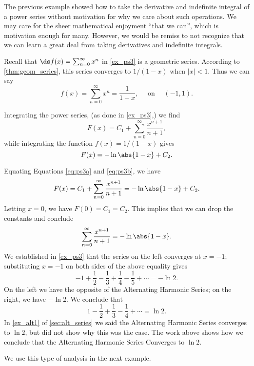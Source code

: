 The previous example showed how to take the derivative and indefinite integral of a power series without motivation for why we care about such operations. We may care for the sheer mathematical enjoyment ``that we can'', which is motivation enough for many. However, we would be remiss to not recognize that we can learn a great deal from taking derivatives and indefinite integrals.\bigskip

Recall that $\ds f(x) = \sum_{n=0}^\infty x^n$ in \autoref{ex_ps3} is a geometric series. According to \autoref{thm:geom_series}, this series converges to $1/(1-x)$ when $|x|<1$. Thus we can say
$$	f(x) = \sum_{n=0}^\infty x^n = \frac 1{1-x},\quad \text{ on }\quad (-1,1).$$

Integrating the power series, (as done in \autoref{ex_ps3},) we find
\begin{equation} F(x)  = C_1+\sum_{n=0}^\infty \frac{x^{n+1}}{n+1},\label{eq:ps3a}\end{equation}
while integrating the function $f(x) = 1/(1-x)$ gives
\begin{equation} F(x)  = -\ln\abs{1-x} + C_2.\label{eq:ps3b}\end{equation}

Equating Equations \eqref{eq:ps3a} and \eqref{eq:ps3b}, we have 
$$F(x) = C_1+\sum_{n=0}^\infty \frac{x^{n+1}}{n+1} = -\ln\abs{1-x} + C_2.$$
Letting $x=0$, we have $F(0) = C_1 = C_2$. This implies that we can drop the constants and conclude
$$\sum_{n=0}^\infty \frac{x^{n+1}}{n+1} = -\ln\abs{1-x}.$$
We established in \autoref{ex_ps3} that the series on the left converges at $x=-1$; substituting $x=-1$ on both sides of the above equality gives
$$-1+\frac12-\frac13+\frac14-\frac15+\dotsb = -\ln 2.$$
On the left we have the opposite of the Alternating Harmonic Series; on the right, we have $-\ln 2$. We conclude that 
$$1-\frac12+\frac13-\frac14+\dotsb = \ln 2.$$
In \autoref{ex_alt1} of \autoref{sec:alt_series} we said the Alternating Harmonic Series converges to $\ln 2$, but did not show why this was the case. The work above shows how we conclude that the Alternating Harmonic Series Converges to $\ln 2$. 

We use this type of analysis in the next example.

